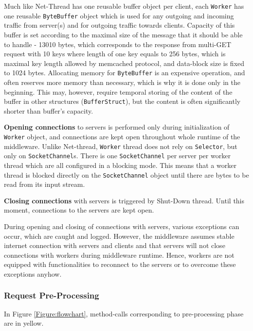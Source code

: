 \documentclass[11pt,a4paper]{article}
\begin{document}
Much like Net-Thread has one reusable buffer object per client, each \texttt{Worker} has one reusable \texttt{ByteBuffer} object which is used for any outgoing and incoming traffic from server(s) and for outgoing traffic towards clients. Capacity of this buffer is set according to the maximal size of the message that it should be able to handle - 13010 bytes, which corresponds to the response from multi-GET request with 10 keys where length of one key equals to 256 bytes, which is maximal key length allowed by memcached protocol, and data-block size is fixed to 1024 bytes. Allocating memory for \texttt{ByteBuffer} is an expensive operation, and often reserves more memory than necessary, which is why it is done only in the beginning. This may, however, require temporal storing of the content of the buffer in other structures (\texttt{BufferStruct}), but the content is often significantly shorter than buffer's capacity. 

\textbf{Opening connections} to servers is performed only during initialization of \texttt{Worker} object, and connections are kept open throughout whole runtime of the middleware. Unlike Net-thread, \texttt{Worker} thread does not rely on \texttt{Selector}, but only on \texttt{SocketChannel}s. There is one \texttt{SocketChannel} per server per worker thread which are all configured in a blocking mode. This means that a worker thread is blocked directly on the \texttt{SocketChannel} object until there are bytes to be read from its input stream.

\textbf{Closing connections} with servers is triggered by Shut-Down thread. Until this moment, connections to the servers are kept open.

During opening and closing of connections with servers, various exceptions can occur, which are caught and logged. However, the middleware assumes stable internet connection with servers and clients and that servers will not close connections with workers during middleware runtime. Hence, workers are not equipped with functionalities to reconnect to the servers or to overcome these exceptions anyhow.

\subsubsection{Request Pre-Processing}

In Figure \ref{Figure:flowchart}, method-calls corresponding to pre-processing phase are in yellow.
\end{document}
